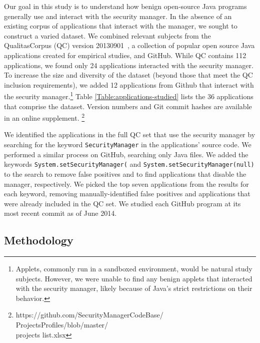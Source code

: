 \documentclass{sig-alternate}
\begin{document}
Our goal in this study is to understand how benign open-source Java programs
generally use
and interact with the security manager.  In the absence of an existing corpus of
applications that interact with the manager, we sought to construct a varied dataset.
We combined relevant subjects from 
the QualitasCorpus (QC) version 20130901~\cite{QualitasCorpus:APSEC:2010}, a 
collection of popular open source Java applications created for empirical
studies, and GitHub.
While QC contains 112 applications, we found only 24 applications interacted with 
the security manager.  To increase the size and diversity of the dataset (beyond
those that meet the QC inclusion requirements), we
added 12 applications from Github that interact with the security manager.\footnote{Applets, commonly
run in a sandboxed environment, would be natural study subjects.  However, we were unable
to find any benign applets that interacted with the security manager, likely
because of Java's strict restrictions on their behavior.}
 Table
\ref{Table:applications-studied} lists the 36 applications that comprise the
dataset.  Version numbers
and Git commit hashes are available in an online supplement.%
\footnote{https://github.com/SecurityManagerCodeBase/\\
ProjectsProfiles/blob/master/\\
projects list.xlsx}

We identified the applications in the full QC set that use the security
manager by searching for the keyword \texttt{SecurityManager} in the applications'
source code.  We performed a similar process on
GitHub, searching only Java files. We added the keywords
\texttt{System.setSecurityManager(} and \texttt{System.setSecurityManager(null)}
to the search to remove false positives and to find applications that disable the
manager, respectively. We picked the top seven applications from the results for each keyword,
removing manually-identified false positives and applications that were
already included in the QC set. We studied each GitHub program at its most
recent commit as of June 2014.

\subsection{Methodology}
\label{sec:methodology}
\end{document}
